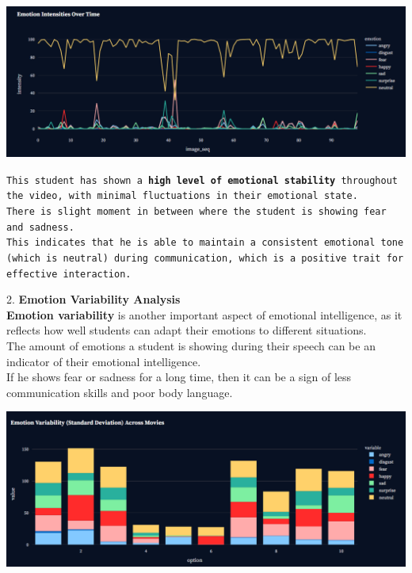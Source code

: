 \documentclass{article}
\begin{document}
\begin{center}
    \includegraphics[width=1\columnwidth]{images/emotion_intensity_over_time.png}
\end{center}

\texttt{This student has shown a \textbf{high level of emotional stability} throughout the video, with minimal fluctuations in their emotional state.\\

There is slight moment in between where the student is showing fear and sadness.\\

This indicates that he is able to maintain a consistent emotional tone (which is neutral) during communication, which is a positive trait for effective interaction.\\
}
\normalfont

2. \textbf{Emotion Variability Analysis}\\

\textbf{Emotion variability} is another important aspect of emotional intelligence, as it reflects how well students can adapt their emotions to different situations.\\

The amount of emotions a student is showing during their speech can be an indicator of their emotional intelligence.\\

If he shows fear or sadness for a long time, then it can be a sign of less communication skills and poor body language.\\
\begin{center}
    \includegraphics[width=1\columnwidth]{images/emotion_variablity.png}
\end{center}
\end{document}
